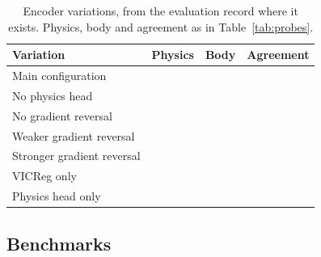 \begin{table}[tbp]
\centering
\caption{Encoder variations, from the evaluation record where it exists. Physics, body and agreement as in
Table~\ref{tab:probes}.}
\label{tab:variations}
\footnotesize
\begin{tabular}{@{}lccc@{}}
\toprule
Variation & Physics & Body & Agreement \\
\midrule
Main configuration & \VarMainPhysR{} & \VarMainBodyAcc{} & \VarMainRho{} \\
No physics head & \VarNoPhysPhysR{} & \VarNoPhysBodyAcc{} & \VarNoPhysRho{} \\
No gradient reversal & \VarLambdaZeroPhysR{} & \VarLambdaZeroBodyAcc{} & \VarLambdaZeroRho{} \\
Weaker gradient reversal & \VarLambdaTenthPhysR{} & \VarLambdaTenthBodyAcc{} & \VarLambdaTenthRho{} \\
Stronger gradient reversal & \VarLambdaOnePhysR{} & \VarLambdaOneBodyAcc{} & \VarLambdaOneRho{} \\
VICReg only & \VarVicregOnlyPhysR{} & \VarVicregOnlyBodyAcc{} & \VarVicregOnlyRho{} \\
Physics head only & \VarPhysOnlyPhysR{} & \VarPhysOnlyBodyAcc{} & \VarPhysOnlyRho{} \\
\bottomrule
\end{tabular}
\end{table}

\subsection{Benchmarks}
\label{sec:benchmarks}

